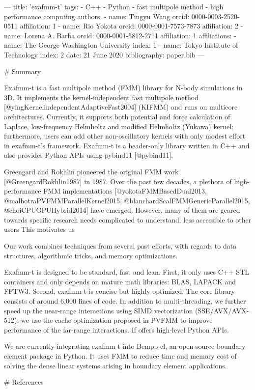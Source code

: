 ---
title: 'exafmm-t'
tags:
  - C++
  - Python
  - fast multipole method
  - high performance computing
authors:
 - name: Tingyu Wang
   orcid: 0000-0003-2520-0511
   affiliation: 1
 - name: Rio Yokota
   orcid: 0000-0001-7573-7873
   affiliation: 2
 - name: Lorena A. Barba
   orcid: 0000-0001-5812-2711
   affiliation: 1
affiliations:
 - name: The George Washington University
   index: 1
 - name: Tokyo Institute of Technology
   index: 2
date: 21 June 2020
bibliography: paper.bib
---

# Summary

Exafmm-t is a fast multipole method (FMM) library for N-body simulations in 3D.
It implements the kernel-independent fast multipole method [@yingKernelindependentAdaptiveFast2004] (KIFMM) and runs on multicore architectures. 
Currently, it supports both potential and force calculation of Laplace, low-frequency Helmholtz and modified Helmholtz (Yukawa) kernel; furthermore, users can add other non-oscillatory kernels with only modest effort in exafmm-t's framework.
Exafmm-t is a header-only library written in C++ and also provides Python APIs using pybind11 [@pybind11].

Greengard and Rokhlin pioneered the original FMM work [@GreengardRokhlin1987] in 1987.
Over the past few decades, a plethora of high-performance FMM implementations [@yokotaFMMBasedDual2013, @malhotraPVFMMParallelKernel2015, @blanchardScalFMMGenericParallel2015, @choiCPUGPUHybrid2014] have emerged.
However, many of them are geared towards specific research needs complicated to understand.
less accessible to other users
This motivates us 

Our work combines techniques from several past efforts, with regards to data structures, algorithmic tricks, and memory optimizations.

Exafmm-t is designed to be standard, fast and lean.
First, it only uses C++ STL containers and only depends on mature math libraries: BLAS, LAPACK and FFTW3.
Second, exafmm-t is concise but highly optimized. The core library consists of around 6,000 lines of code.
In addition to multi-threading, we further speed up the near-range interactions using SIMD vectorization (SSE/AVX/AVX-512); we use the cache optimization proposed in PVFMM to improve performance of the far-range interactions.
If offers high-level Python APIs.

We are currently integrating exafmm-t into Bempp-cl, an open-source boundary element package in Python.
It uses FMM to reduce time and memory cost of solving the dense linear systems arising in boundary element applications.

# References
